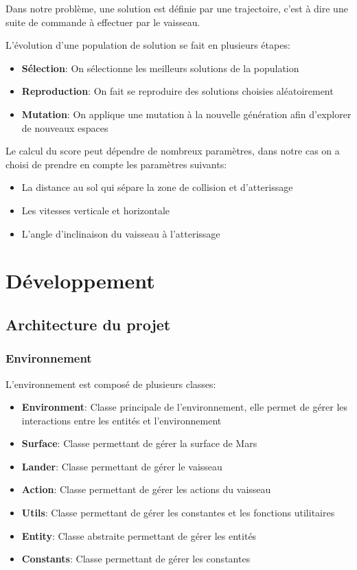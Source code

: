 \documentclass[french,a4paper,10pt,twocolumn]{article}
\begin{document}
Dans notre problème, une solution est définie par une trajectoire, c'est à dire une suite de commande à effectuer par le vaisseau.

L'évolution d'une population de solution se fait en plusieurs étapes:
\begin{itemize}
    \item \textbf{Sélection}: On sélectionne les meilleurs solutions de la population
    \item \textbf{Reproduction}: On fait se reproduire des solutions choisies aléatoirement
    \item \textbf{Mutation}: On applique une mutation à la nouvelle génération afin d'explorer de nouveaux espaces
\end{itemize}


Le calcul du score peut dépendre de nombreux paramètres, dans notre cas on a choisi de prendre en compte les paramètres suivants:
\begin{itemize}
    \item La distance au sol qui sépare la zone de collision et d'atterissage
    \item Les vitesses verticale et horizontale 
    \item L'angle d'inclinaison du vaisseau à l'atterissage
\end{itemize}

\section{Développement}
\subsection{Architecture du projet}

\subsubsection{Environnement}

L'environnement est composé de plusieurs classes:
\begin{itemize}
    \item \textbf{Environment}: Classe principale de l'environnement, elle permet de gérer les interactions entre les entités et l'environnement
    \item \textbf{Surface}: Classe permettant de gérer la surface de Mars
    \item \textbf{Lander}: Classe permettant de gérer le vaisseau
    \item \textbf{Action}: Classe permettant de gérer les actions du vaisseau
    \item \textbf{Utils}: Classe permettant de gérer les constantes et les fonctions utilitaires
    \item \textbf{Entity}: Classe abstraite permettant de gérer les entités
    \item \textbf{Constants}: Classe permettant de gérer les constantes
\end{itemize}
\end{document}
